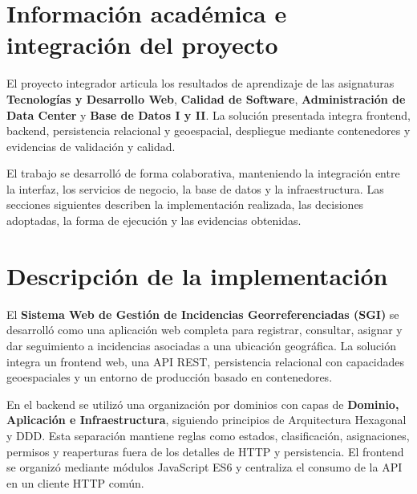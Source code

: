 \documentclass[12pt,a4paper]{article}
\begin{document}
\clearpage
{}
\setcounter{page}{1}

\tableofcontents
\clearpage

\listoffigures
\clearpage

\listoftables
\clearpage

\section*{Información académica e integración del proyecto}

El proyecto integrador articula los resultados de aprendizaje de las asignaturas
\textbf{Tecnologías y Desarrollo Web}, \textbf{Calidad de Software},
\textbf{Administración de Data Center} y \textbf{Base de Datos I y II}. La solución
presentada integra frontend, backend, persistencia relacional y geoespacial,
despliegue mediante contenedores y evidencias de validación y calidad.

El trabajo se desarrolló de forma colaborativa, manteniendo la integración entre
la interfaz, los servicios de negocio, la base de datos y la infraestructura. Las
secciones siguientes describen la implementación realizada, las decisiones
adoptadas, la forma de ejecución y las evidencias obtenidas.

\section{Descripción de la implementación}

El \textbf{Sistema Web de Gestión de Incidencias Georreferenciadas (SGI)} se desarrolló como una aplicación web completa para registrar, consultar, asignar y dar seguimiento a incidencias asociadas a una ubicación geográfica. La solución integra un frontend web, una API REST, persistencia relacional con capacidades geoespaciales y un entorno de producción basado en contenedores.

En el backend se utilizó una organización por dominios con capas de \textbf{Dominio, Aplicación e Infraestructura}, siguiendo principios de Arquitectura Hexagonal y DDD. Esta separación mantiene reglas como estados, clasificación, asignaciones, permisos y reaperturas fuera de los detalles de HTTP y persistencia. El frontend se organizó mediante módulos JavaScript ES6 y centraliza el consumo de la API en un cliente HTTP común.
\end{document}
